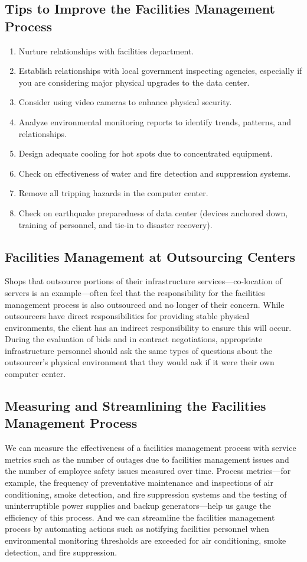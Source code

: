 \documentclass[a4]{article}
\begin{document}
\begin{multicols}{3}
\subsection{Tips to Improve the Facilities Management Process}
\begin{enumerate}
    \item Nurture relationships with facilities department.
    \item Establish relationships with local government inspecting agencies, 
        especially if you are considering major physical upgrades to the data center.
    \item Consider using video cameras to enhance physical security.
    \item Analyze environmental monitoring
        reports to identify trends, patterns, and relationships.
    \item Design adequate cooling for hot spots due to concentrated equipment.
    \item Check on effectiveness of water and fire detection and suppression systems.
    \item Remove all tripping hazards in the computer center.
    \item Check on earthquake preparedness of data center
        (devices anchored down, training of personnel, and tie-in to disaster recovery).
\end{enumerate}
\subsection{Facilities Management at Outsourcing Centers}
Shops that outsource portions of their infrastructure services—co-location of servers is an example—often feel that the 
responsibility for the facilities management process is also outsourced and no longer of their concern. 
While outsourcers have direct responsibilities for providing stable physical environments, the client has an 
indirect responsibility to ensure this will occur. 
During the evaluation of bids and in contract negotiations, appropriate infrastructure personnel should ask the same 
types of questions about the outsourcer’s physical environment that they would ask if it were their own computer center.
\subsection{Measuring and Streamlining the Facilities Management Process}
We can measure the effectiveness of a facilities management process with service metrics such as the number 
of outages due to facilities management issues and the number of employee safety issues measured over time. 
Process metrics—for example, the frequency of preventative maintenance and inspections of air conditioning, 
smoke detection, and fire suppression systems and the testing of uninterruptible power supplies and backup 
generators—help us gauge the efficiency of this process. And we can streamline the facilities management process by 
automating actions such as notifying facilities personnel when environmental monitoring thresholds are exceeded 
for air conditioning, smoke detection, and fire suppression.


\end{multicols}
\end{document}
